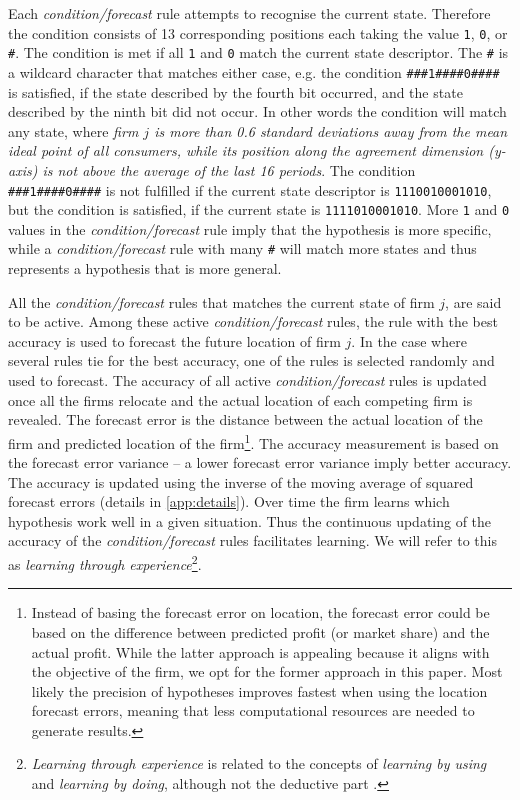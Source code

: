 \documentclass[preprint, 12pt]{elsarticle}
\begin{document}
Each \emph{condition/forecast} rule attempts to recognise the current state. Therefore the condition consists of 13 corresponding positions each taking the value \texttt{1}, \texttt{0}, or \texttt{\#}. The condition is met if all \texttt{1} and \texttt{0} match the current state descriptor. The \texttt{\#} is a wildcard character that matches either case, e.g. the condition \texttt{\#\#\#1\#\#\#\#0\#\#\#\#} is satisfied, if the state described by the fourth bit occurred, and the state described by the ninth bit did not occur. In other words the condition will match any state, where \emph{firm $j$ is more than 0.6 standard deviations away from the mean ideal point of all consumers, while its position along the agreement dimension (y-axis) is not above the average of the last 16 periods}. The condition \texttt{\#\#\#1\#\#\#\#0\#\#\#\#} is not fulfilled if the current state descriptor is \texttt{1110010001010}, but the condition is satisfied, if the current state is \texttt{1111010001010}. More \texttt{1} and \texttt{0} values in the \emph{condition/forecast} rule imply that the hypothesis is more specific, while a \emph{condition/forecast} rule with many \texttt{\#} will match more states and thus represents a hypothesis that is more general.

All the \emph{condition/forecast} rules that matches the current state of firm $j$, are said to be active. Among these active \emph{condition/forecast} rules, the rule with the best accuracy is used to forecast the future location of firm $j$. In the case where several rules tie for the best accuracy, one of the rules is selected randomly and used to forecast. The accuracy of all active \emph{condition/forecast} rules is updated once all the firms relocate and the actual location of each competing firm is revealed. The forecast error is the distance between the actual location of the firm and predicted location of the firm\footnote{Instead of basing the forecast error on location, the forecast error could be based on the difference between predicted profit (or market share) and the actual profit. While the latter approach is appealing because it aligns with the objective of the firm, we opt for the former approach in this paper. Most likely the precision of hypotheses improves fastest when using the location forecast errors, meaning that less computational resources are needed to generate results.}. The accuracy measurement is based on the forecast error variance -- a lower forecast error variance imply better accuracy. The accuracy is updated using the inverse of the moving average of squared forecast errors (details in \ref{app:details}). Over time the firm learns which hypothesis work well in a given situation. Thus the continuous updating of the accuracy of the \emph{condition/forecast} rules facilitates learning. We will refer to this as \emph{learning through experience}\footnote{\emph{Learning through experience} is related to the concepts of \emph{learning by using} \citep{Rosenberg_1982} and \emph{learning by doing}, although not the deductive part \citep{Arrow_1971}.}.
\end{document}
